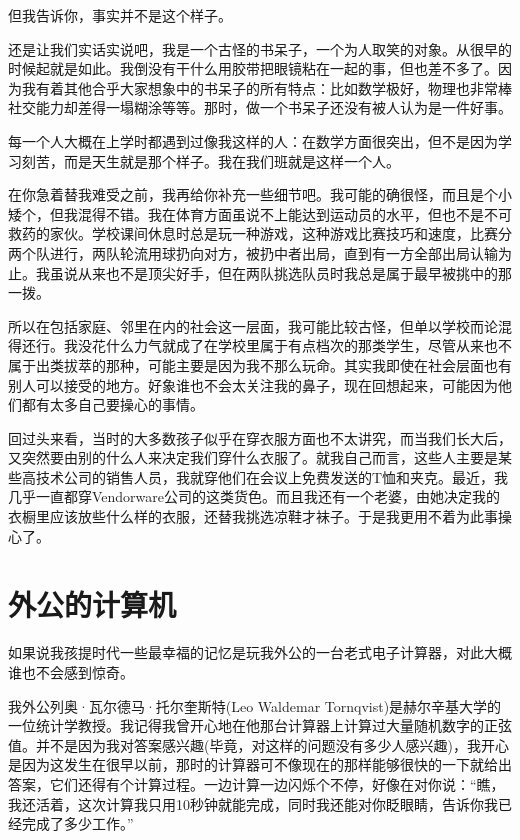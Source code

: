 但我告诉你，事实并不是这个样子。

还是让我们实话实说吧，我是一个古怪的书呆子，一个为人取笑的对象。从很早的时候起就是如此。我倒没有干什么用胶带把眼镜粘在一起的事，但也差不多了。因为我有着其他合乎大家想象中的书呆子的所有特点：比如数学极好，物理也非常棒社交能力却差得一塌糊涂等等。那时，做一个书呆子还没有被人认为是一件好事。

每一个人大概在上学时都遇到过像我这样的人：在数学方面很突出，但不是因为学习刻苦，而是天生就是那个样子。我在我们班就是这样一个人。

在你急着替我难受之前，我再给你补充一些细节吧。我可能的确很怪，而且是个小矮个，但我混得不错。我在体育方面虽说不上能达到运动员的水平，但也不是不可救药的家伙。学校课间休息时总是玩一种游戏，这种游戏比赛技巧和速度，比赛分两个队进行，两队轮流用球扔向对方，被扔中者出局，直到有一方全部出局认输为止。我虽说从来也不是顶尖好手，但在两队挑选队员时我总是属于最早被挑中的那一拨。

所以在包括家庭、邻里在内的社会这一层面，我可能比较古怪，但单以学校而论混得还行。我没花什么力气就成了在学校里属于有点档次的那类学生，尽管从来也不属于出类拔萃的那种，可能主要是因为我不那么玩命。其实我即使在社会层面也有别人可以接受的地方。好象谁也不会太关注我的鼻子，现在回想起来，可能因为他们都有太多自己要操心的事情。

回过头来看，当时的大多数孩子似乎在穿衣服方面也不太讲究，而当我们长大后，又突然要由别的什么人来决定我们穿什么衣服了。就我自己而言，这些人主要是某些高技术公司的销售人员，我就穿他们在会议上免费发送的T恤和夹克。最近，我几乎一直都穿Vendorware公司的这类货色。而且我还有一个老婆，由她决定我的衣橱里应该放些什么样的衣服，还替我挑选凉鞋才袜子。于是我更用不着为此事操心了。

 

 
\section{外公的计算机}

如果说我孩提时代一些最幸福的记忆是玩我外公的一台老式电子计算器，对此大概谁也不会感到惊奇。

我外公列奥·瓦尔德马·托尔奎斯特(Leo Waldemar Tornqvist)是赫尔辛基大学的一位统计学教授。我记得我曾开心地在他那台计算器上计算过大量随机数字的正弦值。并不是因为我对答案感兴趣(毕竟，对这样的问题没有多少人感兴趣)，我开心是因为这发生在很早以前，那时的计算器可不像现在的那样能够很快的一下就给出答案，它们还得有个计算过程。一边计算一边闪烁个不停，好像在对你说：“瞧，我还活着，这次计算我只用10秒钟就能完成，同时我还能对你眨眼睛，告诉你我已经完成了多少工作。”

